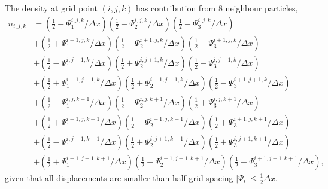 \documentclass[a4paper,11pt]{article}
\begin{document}
The density at grid point $(i, j, k)$ has contribution from 8 neighbour particles,
\begin{equation}
  \label{eq:n-nonlinear}
\begin{split}
  n_{i,j,k} &= \left( \frac{1}{2} - \Psi_1^{i,   j,   k  }/\Delta x \right)
              \left( \frac{1}{2} - \Psi_2^{i,   j,   k  }/\Delta x \right)
              \left( \frac{1}{2} - \Psi_3^{i,   j,   k  }/\Delta x \right)\\
           &+ \left( \frac{1}{2} + \Psi_1^{i+1, j,   k  }/\Delta x \right)
              \left( \frac{1}{2} - \Psi_2^{i+1, j,   k  }/\Delta x \right)
              \left( \frac{1}{2} - \Psi_3^{i+1, j,   k  }/\Delta x \right)\\
           &+ \left( \frac{1}{2} - \Psi_1^{i,   j+1, k  }/\Delta x \right)
              \left( \frac{1}{2} + \Psi_2^{i,   j+1, k  }/\Delta x \right)
              \left( \frac{1}{2} - \Psi_3^{i,   j+1, k  }/\Delta x \right)\\
           &+ \left( \frac{1}{2} + \Psi_1^{i+1, j+1, k  }/\Delta x \right)
              \left( \frac{1}{2} + \Psi_2^{i+1, j+1, k  }/\Delta x \right)
              \left( \frac{1}{2} - \Psi_3^{i+1, j+1, k  }/\Delta x \right)\\
           &+ \left( \frac{1}{2} - \Psi_1^{i,   j  , k+1}/\Delta x \right)
              \left( \frac{1}{2} - \Psi_2^{i,   j  , k+1}/\Delta x \right)
              \left( \frac{1}{2} + \Psi_3^{i,   j  , k+1}/\Delta x \right)\\
           &+ \left( \frac{1}{2} + \Psi_1^{i+1, j  , k+1}/\Delta x \right)
              \left( \frac{1}{2} - \Psi_2^{i+1, j  , k+1}/\Delta x \right)
              \left( \frac{1}{2} + \Psi_3^{i+1, j  , k+1}/\Delta x \right)\\
           &+ \left( \frac{1}{2} - \Psi_1^{i,   j+1, k+1}/\Delta x \right)
              \left( \frac{1}{2} + \Psi_2^{i,   j+1, k+1}/\Delta x \right)
              \left( \frac{1}{2} + \Psi_3^{i,   j+1, k+1}/\Delta x \right)\\
           &+ \left( \frac{1}{2} + \Psi_1^{i+1, j+1, k+1}/\Delta x \right)
              \left( \frac{1}{2} + \Psi_2^{i+1, j+1, k+1}/\Delta x \right)
              \left( \frac{1}{2} + \Psi_3^{i+1, j+1, k+1}/\Delta x \right),
\end{split}
\end{equation}
given that all displacements are smaller than half grid spacing
$|\Psi_i| \le \frac{1}{2} \Delta x$.
\end{document}
